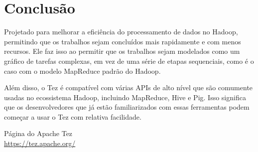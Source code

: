 \documentclass[a4paper,11pt]{article}
\begin{document}


\section{Conclusão}
Projetado para melhorar a eficiência do processamento de dados no Hadoop, permitindo que os trabalhos sejam concluídos mais rapidamente e com menos recursos. Ele faz isso ao permitir que os trabalhos sejam modelados como um gráfico de tarefas complexas, em vez de uma série de etapas sequenciais, como é o caso com o modelo MapReduce padrão do Hadoop.

Além disso, o Tez é compatível com várias APIs de alto nível que são comumente usadas no ecossistema Hadoop, incluindo MapReduce, Hive e Pig. Isso significa que os desenvolvedores que já estão familiarizados com essas ferramentas podem começar a usar o Tez com relativa facilidade.



\begin{thebibliography}{4}
	Página do Apache Tez \\
	\url{https://tez.apache.org/}

	
\end{thebibliography}
\end{document}
